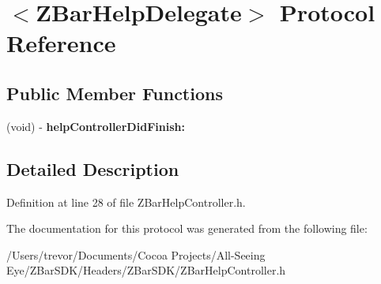 \hypertarget{protocol_z_bar_help_delegate-p}{
\section{$<$ZBarHelpDelegate$>$ Protocol Reference}
\label{protocol_z_bar_help_delegate-p}
}
\subsection*{Public Member Functions}
\begin{DoxyCompactItemize}
\item 
\hypertarget{protocol_z_bar_help_delegate-p_aa9f9204d1d886fb59a657a546b956d6e}{
(void) -\/ {\bfseries helpControllerDidFinish:}}
\label{protocol_z_bar_help_delegate-p_aa9f9204d1d886fb59a657a546b956d6e}

\end{DoxyCompactItemize}


\subsection{Detailed Description}


Definition at line 28 of file ZBarHelpController.h.



The documentation for this protocol was generated from the following file:\begin{DoxyCompactItemize}
\item 
/Users/trevor/Documents/Cocoa Projects/All-\/Seeing Eye/ZBarSDK/Headers/ZBarSDK/ZBarHelpController.h\end{DoxyCompactItemize}
